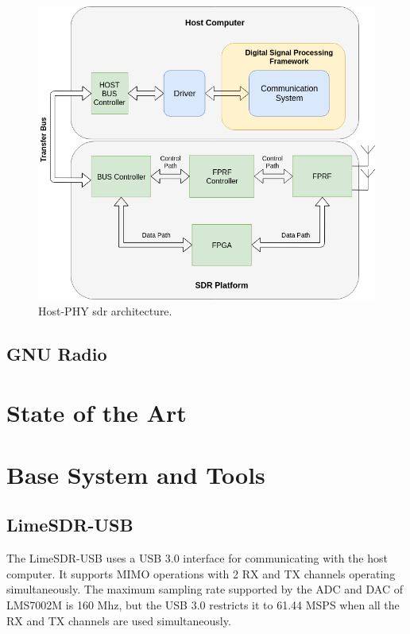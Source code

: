 \begin{figure}[h!]
\centering
\label{host_PHY}
\includegraphics[width=\textwidth]{Figure/Host_Phy.png}
\caption{Host-PHY \cite{nychis_enabling_nodate} \ac{sdr} architecture.}
\end{figure}

\subsection{GNU Radio}

\section{State of the Art}
\section{Base System and Tools}
 
\subsection{LimeSDR-USB}
The LimeSDR-USB uses a USB 3.0 interface for communicating with the host computer. It supports MIMO operations with 2 RX and TX channels operating simultaneously. The maximum sampling rate supported by the ADC and DAC of LMS7002M is 160 Mhz, but the USB 3.0 restricts it to 61.44 MSPS when all the RX and TX channels are used simultaneously.

